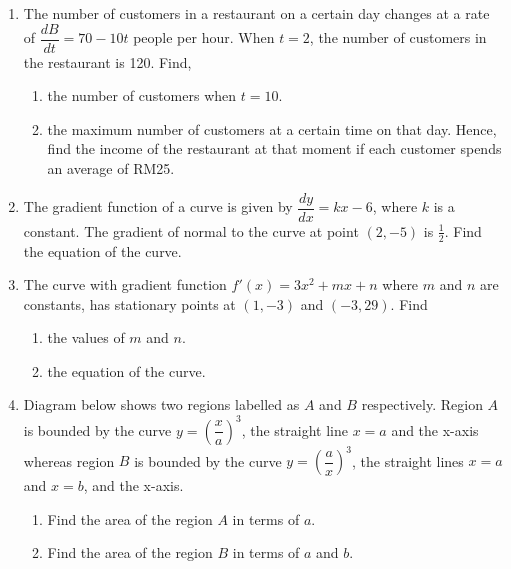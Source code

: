 \documentclass{report}
\begin{document}
\begin{multicols*}{2}
\begin{enumerate}
            \item The number of customers in a restaurant on a certain day changes at a rate of
                  $\dfrac{dB}{dt} = 70 - 10t$ people per hour. When $t = 2$, the number of
                  customers in the restaurant is 120. Find,
                  \begin{enumerate}
                        \item the number of customers when $t = 10$.

                        \item the maximum number of customers at a certain time on that day. Hence, find the
                              income of the restaurant at that moment if each customer spends an average of
                              RM25.
                  \end{enumerate}

            \item The gradient function of a curve is given by $\dfrac{dy}{dx} = kx - 6$, where
                  $k$ is a constant. The gradient of normal to the curve at point $(2, -5)$ is
                  $\frac{1}{2}$. Find the equation of the curve.

            \item The curve with gradient function $f'(x) = 3x^2 + mx + n$ where $m$ and $n$ are
                  constants, has stationary points at $(1, -3)$ and $(-3, 29)$. Find
                  \begin{enumerate}
                        \item the values of $m$ and $n$.

                        \item the equation of the curve.
                  \end{enumerate}

            \item Diagram below shows two regions labelled as $A$ and $B$ respectively. Region
                  $A$ is bounded by the curve $y = {\left(\dfrac{x}{a}\right)}^3$, the straight
                  line $x = a$ and the x-axis whereas region $B$ is bounded by the curve $y =
                        {\left(\dfrac{a}{x}\right)}^3$, the straight lines $x = a$ and $x = b$, and the
                  x-axis.
                  \begin{enumerate}
                        \item Find the area of the region $A$ in terms of $a$.

                        \item Find the area of the region $B$ in terms of $a$ and $b$.


\end{enumerate}
\end{enumerate}
\end{multicols*}
\end{document}
